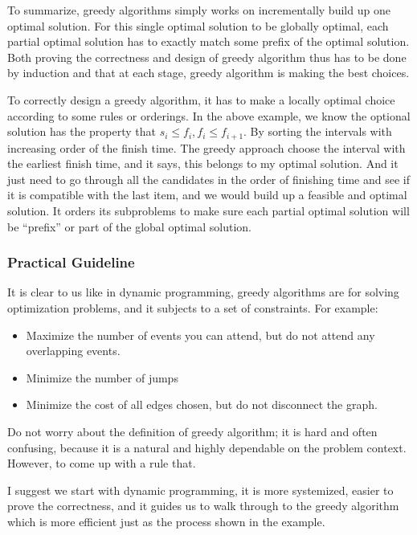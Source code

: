 \documentclass[../main.tex]{subfiles}
\begin{document}
To summarize, greedy algorithms simply works on incrementally build up one optimal solution. For this single optimal solution to be globally optimal, each partial optimal solution has to exactly match some prefix of the optimal solution. Both proving the correctness and design of greedy algorithm thus has to be done by induction and that at each stage, greedy algorithm is making the best choices.  

To  correctly design a greedy algorithm, it has to make a locally optimal choice according to some rules or orderings.  In the above example, we know the optional solution has the property that $s_i \leq f_i, f_i \leq f_{i+1}$.     By sorting the intervals with increasing order of the finish time. The greedy approach choose the interval with the earliest finish time, and it says, this belongs to my optimal solution. And it just need to go through all the candidates in the order of finishing time and see if it is compatible with the last item, and we would build up a feasible and optimal solution. It orders its subproblems to make sure each partial optimal solution will be ``prefix'' or part of the global optimal solution. 
\subsubsection{Practical Guideline}
It is clear to us like in dynamic programming, greedy algorithms are for solving optimization problems, and it subjects to a set of constraints. For example:
\begin{itemize}
    \item Maximize the number of events you can attend, but do not attend any overlapping events.
    \item Minimize the number of jumps
    \item Minimize the cost of all edges chosen, but do not disconnect the graph.
\end{itemize}

Do not worry about the definition of greedy algorithm; it is hard and often confusing, because it is a natural and highly dependable on the problem context. However, to come up with a rule that. 

I suggest we start with dynamic programming, it is more systemized, easier to prove the correctness, and it guides us to walk through to the greedy algorithm which is more efficient just as the process shown in the example. 
\end{document}
